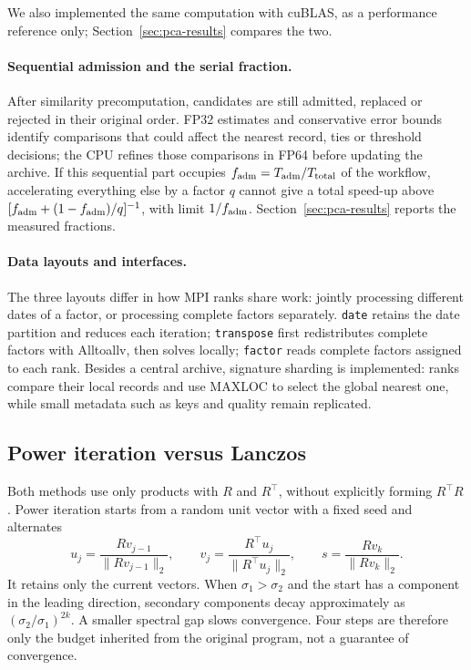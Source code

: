 \documentclass[11pt,a4paper]{article}
\newcommand{\code}[1]{\texttt{#1}}
\begin{document}
We also implemented the same computation with cuBLAS, as a performance reference only; Section~\ref{sec:pca-results} compares the two.

\paragraph{Sequential admission and the serial fraction.}
After similarity precomputation, candidates are still admitted, replaced or rejected in their original order. FP32 estimates and conservative error bounds identify comparisons that could affect the nearest record, ties or threshold decisions; the CPU refines those comparisons in FP64 before updating the archive. If this sequential part occupies $f_{\rm adm}=T_{\rm adm}/T_{\rm total}$ of the workflow, accelerating everything else by a factor $q$ cannot give a total speed-up above $[f_{\rm adm}+(1-f_{\rm adm})/q]^{-1}$, with limit $1/f_{\rm adm}$. Section~\ref{sec:pca-results} reports the measured fractions.

\paragraph{Data layouts and interfaces.}
The three layouts differ in how MPI ranks share work: jointly processing different dates of a factor, or processing complete factors separately. \code{date} retains the date partition and reduces each iteration; \code{transpose} first redistributes complete factors with Alltoallv, then solves locally; \code{factor} reads complete factors assigned to each rank. Besides a central archive, signature sharding is implemented: ranks compare their local records and use MAXLOC to select the global nearest one, while small metadata such as keys and quality remain replicated.

\subsection{Power iteration versus Lanczos}
\label{sec:pca-solvers}
Both methods use only products with $R$ and $R^\top$, without explicitly forming $R^\top R$. Power iteration starts from a random unit vector with a fixed seed and alternates
\begin{equation}
 u_j=\frac{Rv_{j-1}}{\|Rv_{j-1}\|_2},\qquad
 v_j=\frac{R^\top u_j}{\|R^\top u_j\|_2},\qquad
 s=\frac{Rv_k}{\|Rv_k\|_2}.
 \label{eq:power}
\end{equation}
It retains only the current vectors. When $\sigma_1>\sigma_2$ and the start has a component in the leading direction, secondary components decay approximately as $(\sigma_2/\sigma_1)^{2k}$. A smaller spectral gap slows convergence. Four steps are therefore only the budget inherited from the original program, not a guarantee of convergence.
\end{document}
